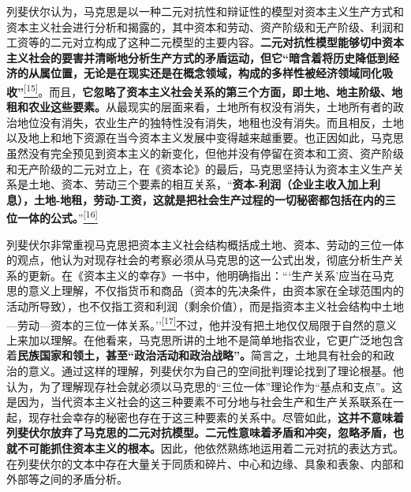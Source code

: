 \documentclass[UTF8, fontset = sourcesans, a4paper, oneside, zihao =
-4, scheme=chinese, no-math, space=true]{ctexbook}
\begin{document}
列斐伏尔认为，马克思是以一种二元对抗性和辩证性的模型对资本主义生产方式和资本主义社会进行分析和揭露的，其中资本和劳动、资产阶级和无产阶级、利润和工资等的二元对立构成了这种二元模型的主要内容。\textbf{二元对抗性模型能够切中资本主义社会的要害并清晰地分析生产方式的矛盾运动，但它``暗含着将历史降低到经济的从属位置，无论是在现实还是在概念领域，构成的多样性被经济领域同化吸收''}\protect\hypertarget{part0007_split_001.htmlux5cux23w15}{}{}\protect\hyperlink{part0007_split_004.htmlux5cux23m15}{\textsuperscript{{[}15{]}}}。而且，\textbf{它忽略了资本主义社会关系的第三个方面，即土地、地主阶级、地租和农业这些要素。}从最现实的层面来看，土地所有权没有消失，土地所有者的政治地位没有消失，农业生产的独特性没有消失，地租也没有消失。而且相反，土地以及地上和地下资源在当今资本主义发展中变得越来越重要。也正因如此，马克思虽然没有完全预见到资本主义的新变化，但他并没有停留在资本和工资、资产阶级和无产阶级的二元对立上，在《资本论》的最后，马克思坚持认为资本主义生产关系是土地、资本、劳动三个要素的相互关系，``\textbf{资本-利润（企业主收入加上利息），土地-地租，劳动-工资，这就是把社会生产过程的一切秘密都包括在内的三位一体的公式。}''\protect\hypertarget{part0007_split_001.htmlux5cux23w16}{}{}\protect\hyperlink{part0007_split_004.htmlux5cux23m16}{\textsuperscript{{[}16{]}}}

列斐伏尔非常重视马克思把资本主义社会结构概括成土地、资本、劳动的三位一体的观点，他认为对现存社会的考察必须从马克思的这一公式出发，彻底分析生产关系的更新。在《资本主义的幸存》一书中，他明确指出：```生产关系'应当在马克思的意义上理解，不仅指货币和商品（资本的先决条件，由资本家在全球范围内的活动所导致），也不仅指工资和利润（剩余价值），而是指资本主义社会结构中土地---劳动---资本的三位一体关系。''\protect\hypertarget{part0007_split_001.htmlux5cux23w17}{}{}\protect\hyperlink{part0007_split_004.htmlux5cux23m17}{\textsuperscript{{[}17{]}}}不过，他并没有把土地仅仅局限于自然的意义上来加以理解。在他看来，马克思所讲的土地不是简单地指农业，它更广泛地包含着\textbf{民族国家和领土，甚至``政治活动和政治战略''。}简言之，土地具有社会的和政治的意义。通过这样的理解，列斐伏尔为自己的空间批判理论找到了理论根基。他认为，为了理解现存社会就必须以马克思的``三位一体''理论作为``基点和支点''。这是因为，当代资本主义社会的这三种要素不可分地与社会生产和生产关系联系在一起，现存社会幸存的秘密也存在于这三种要素的关系中。尽管如此，\textbf{这并不意味着列斐伏尔放弃了马克思的二元对抗模型。二元性意味着矛盾和冲突，忽略矛盾，也就不可能抓住资本主义的根本。}因此，他依然熟练地运用着二元对抗的表达方式。在列斐伏尔的文本中存在大量关于同质和碎片、中心和边缘、具象和表象、内部和外部等之间的矛盾分析。
\end{document}
